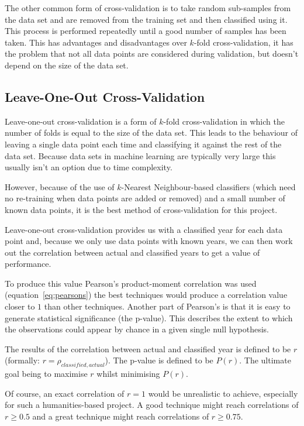 The other common form of cross-validation is to take random sub-samples from the data set and are
removed from the training set and then classified using it. This process is performed repeatedly
until a good number of samples has been taken. This has advantages and disadvantages over $k$-fold
cross-validation, it has the problem that not all data points are considered during validation,
but doesn't depend on the size of the data set.


\subsection{Leave-One-Out Cross-Validation}
Leave-one-out cross-validation is a form of $k$-fold cross-validation in which the number of folds
is equal to the size of the data set. This leads to the behaviour of leaving a single data point
each time and classifying it against the rest of the data set. Because data sets in machine 
learning are typically very large this usually isn't an option due to time complexity.

However, because of the use of $k$-Nearest Neighbour-based classifiers (which need no re-training 
when data points are added or removed) and a small number of known data points, it is the best 
method of cross-validation for this project.

Leave-one-out cross-validation provides us with a classified year for each data point and, because
we only use data points with known years, we can then work out the correlation between actual and
classified years to get a value of performance.

To produce this value Pearson's product-moment correlation was used (equation~\ref{eq:pearsons})
the best techniques would produce a correlation value closer to $1$ than other techniques. Another
part of Pearson's is that it is easy to generate statistical significance (the p-value). This
describes the extent to which the observations could appear by chance in a given single null
hypothesis.

The results of the correlation between actual and classified year is defined to be $r$ 
(formally: $r=\rho_{classified, actual}$). The p-value is defined to be $P(r)$. The ultimate goal 
being to maximise $r$ whilst minimising $P(r)$.

Of course, an exact correlation of $r=1$ would be unrealistic to achieve, especially for such a 
humanities-based project. A good technique might reach correlations of $r \ge 0.5$ and a great
technique might reach correlations of $r \ge 0.75$.

